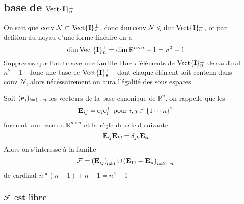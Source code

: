 \documentclass[10pt]{article}
\newcommand{\R}{\mathbb{R}}
\newcommand{\conv}{\mathrm{conv} \;}
\newcommand{\matr}[2]{\R^{#1 \times #2}}
\newcommand{\nilp}{\mathcal{N}}
\newcommand{\trnul}{\mathrm{Vect}\{{\bf I}\}_n^{\bot}}
\newcommand{\tran}{^{\top}}
\newcommand{\ei}[1]{{\bf e}_{#1}}
\newcommand{\Eij}[1]{{\bf E}_{#1}}
\begin{document}
\subsection{base de $\trnul$}

On sait que $\conv \nilp \subset \trnul$, donc $\dim \conv \nilp \leqslant \dim \trnul$, or par defition du noyau d'une forme linéaire 
on a
$$
\dim \trnul = \dim \matr{n}{n} - 1  = n^2  - 1
$$
Supposons que l'on trouve une famille libre d'éléments de $\trnul$ de cardinal $n^2 - 1 $ -  donc une base de $\trnul$ - dont chaque élément
soit contenu dans $\conv \nilp$, alors nécéssairement on aura l'égalité des sous espaces

Soit $(\ei{i})_{i=1\cdots n}$ les vecteurs de la base canonique de $\R^n$, on rappelle que les
$$
\Eij{ij} = \ei{i} \ei{j} \tran \mbox{ pour } i,j \in \{1 \cdots n\}^2
$$
forment une base de $\matr{n}{n}$  et la règle de calcul suivante
$$
\Eij{ij}\Eij{kl} = \delta_{jk}\Eij{il}
$$
Alors on s'interesse à la famille
$$
\mathcal{F} = \left(\Eij{ij}\right)_{i \neq j} \cup \left(\Eij{11}-\Eij{ii}\right)_{i=2\cdots n}
$$
de cardinal $n*(n-1) + n-1 = n^2 -1$

\subsubsection{$\mathcal{F}$ est libre}
\end{document}
